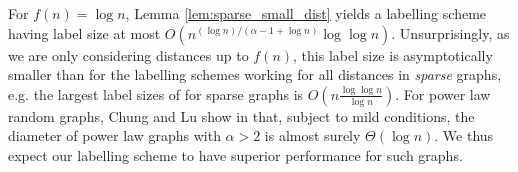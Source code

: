 For $f(n) = \log n$, Lemma \ref{lem:sparse_small_dist} yields a labelling scheme having label size
at most $O\left(n^{(\log n)/(\alpha - 1 + \log n)} \log\log n \right)$. Unsurprisingly, as we are only considering distances up
to $f(n)$, this label size is asymptotically smaller than for the labelling
schemes working for all distances in \emph{sparse} graphs, e.g. the largest label sizes of \cite{DBLP:journals/corr/GawrychowskiKU15} for sparse graphs is $O(n \frac{\log \log n}{ \log n})$.
For power law random graphs, Chung and Lu show in \cite{chung2004average} that, subject to mild conditions, the diameter of power law graphs with $\alpha > 2$ is almost surely $\Theta(\log n)$. We thus expect our labelling scheme to have
superior performance for such graphs.